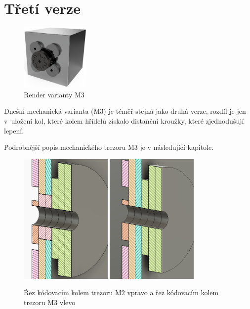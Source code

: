 \section{Třetí verze}
\label{M3-vyvoj}

\begin{figure}
    \centering
    \includegraphics[width=0.3\textwidth]{kapitoly/obrazky/M3/predni_render.png}
    \caption{Render varianty M3}
    \label{fig:M3-miny-render}
\end{figure}

Dnešní mechanická varianta (M3) je téměř stejná jako druhá verze, rozdíl je jen v~uložení kol, které kolem hřídelů získalo distanční kroužky, které
zjednodušují lepení. 

Podrobnější popis mechanického trezoru M3 je v následující kapitole. 

\begin{figure}[h]
    \centering
    \vspace{40mm}
    \includegraphics[width=0.4\textwidth]{kapitoly/obrazky/M3/rez.png}
    \includegraphics[width=0.4\textwidth]{kapitoly/obrazky/M2/rez.png}
    \caption{Řez kódovacím kolem trezoru M2 vpravo a řez kódovacím kolem trezoru M3 vlevo \centering}
    \label{fig:M3-rez-kolem}
\end{figure}

\newpage
